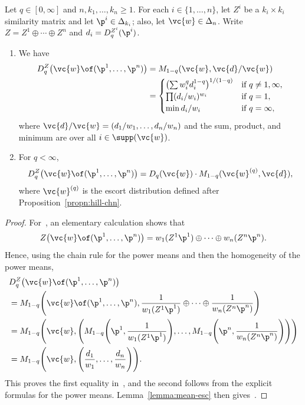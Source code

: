 \begin{propn}
%
% 
Let $q \in [0, \infty]$ and $n, k_1, \ldots, k_n \geq 1$.  For each $i \in
\{1, \ldots, n\}$, let $Z^i$ be a $k_i \times k_i$ similarity matrix and
let $\p^i \in \Delta_{k_i}$; also, let $\vc{w} \in \Delta_n$.  Write $Z =
Z^1 \oplus \cdots \oplus Z^n$ and $d_i = D_q^{Z^i}(\p^i)$.
% 
\begin{enumerate}
\item 
{}
We have
% 
\begin{align*}
D_q^Z\bigl(\vc{w} \of (\p^1, \ldots, \p^n)\bigr)        &
=
M_{1 - q}(\vc{w}, \vc{d}/\vc{w})        \\
&
=
\begin{cases}
\bigl(\sum w_i^q d_i^{1 - q}\bigr)^{1/(1 - q)}  &
\text{if } q \neq 1, \infty, \\
\prod (d_i/w_i)^{w_i}   &
\text{if } q = 1,       \\
\min d_i/w_i    &
\text{if } q = \infty,
\end{cases}
\end{align*}
% 
where $\vc{d}/\vc{w} = (d_1/w_1, \ldots, d_n/w_n)$ and the sum,
product, and minimum are over all $i \in \supp(\vc{w})$. 

\item
{}
For $q < \infty$, 
\[
D_q^Z\bigl(\vc{w} \of (\p^1, \ldots, \p^n)\bigr) 
=
D_q(\vc{w}) \cdot M_{1 - q}(\vc{w}^{(q)}, \vc{d}),
\]
where $\vc{w}^{(q)}$ is the escort distribution defined after
Proposition~\ref{propn:hill-chn}. 
\end{enumerate}
\end{propn}

\begin{proof}
For~, an elementary calculation shows that 
\[
Z\bigl(\vc{w} \of (\p^1, \ldots, \p^n)\bigr) 
=
w_1 (Z^1\p^1) \oplus\cdots\oplus w_n (Z^n\p^n).
\]
Hence, using the chain rule for the power means and then the homogeneity of
the power means,
% 
\begin{align*}
&
D_q^Z\bigl(\vc{w} \of (\p^1, \ldots, \p^n)\bigr)        \\
&
=
M_{1 - q} \Biggl(
\vc{w} \of (\p^1, \ldots, \p^n),
\frac{1}{w_1(Z^1\p^1)} \oplus \cdots \oplus \frac{1}{w_n(Z^n\p^n)}
\Biggr)  \\
&
=
M_{1 - q} \Biggl(
\vc{w}, 
\Biggl(
M_{1 - q} \Biggl( \p^1, \frac{1}{w_1 (Z^1\p^1)} \Biggr),
\ldots,
M_{1 - q} \Biggl( \p^n, \frac{1}{w_n (Z^n\p^n)} \Biggr)
\Biggr)  
\Biggr)\\
&
=
M_{1 - q} \Biggl(
\vc{w}, \Biggl(\frac{d_1}{w_1}, \ldots, \frac{d_n}{w_n}\Biggr)
\Biggr).
\end{align*}
% 
This proves the first equality in~, and the second
follows from the explicit formulas for the power means.
Lemma~\ref{lemma:mean-esc} then gives~.
\end{proof}

